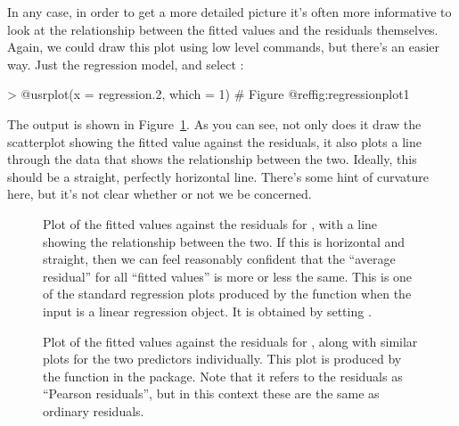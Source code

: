 In any case, in order to get a more detailed picture it's often more informative to look at the relationship between the fitted values and the residuals themselves. Again, we could draw this plot using low level commands, but there's an easier way. Just  the regression model, and select :
\begin{rblock1}
> @usr{plot(x = regression.2, which = 1)}   # Figure @ref{fig:regressionplot1}
\end{rblock1}
The output is shown in Figure~\ref{fig:regressionplot1}. As you can see, not only does it draw the scatterplot showing the fitted value against the residuals, it also plots a line through the data that shows the relationship between the two. Ideally, this should be a straight, perfectly horizontal line. There's some hint of curvature here, but it's not clear whether or not we be concerned. 

\begin{figure}[t]
\begin{center}
\caption{Plot of the fitted values against the residuals for , with a line showing the relationship between the two. If this is horizontal and straight, then we can feel reasonably confident that the ``average residual'' for all ``fitted values'' is more or less the same. This is one of the standard regression plots produced by the  function when the input is a linear regression object. It is obtained by setting .}
\label{fig:regressionplot1}
\HR
\end{center}
\end{figure}

\begin{figure}[t]
\begin{center}
\caption{Plot of the fitted values against the residuals for , along with similar plots for the two predictors individually. This plot is produced by the  function in the  package. Note that it refers to the residuals as ``Pearson residuals'', but in this context these are the same as ordinary residuals. }
\label{fig:residualPlots}
\HR
\end{center}
\end{figure}


